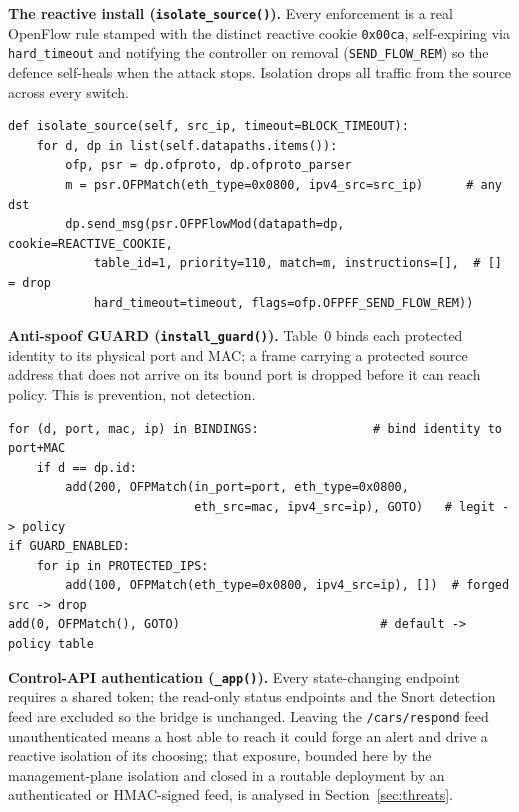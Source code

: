 \noindent \textbf{The reactive install (\texttt{isolate\_source()}).} Every enforcement is a real OpenFlow rule stamped with the distinct reactive cookie \texttt{0x00ca}, self-expiring via \texttt{hard\_timeout} and notifying the controller on removal (\texttt{SEND\_FLOW\_REM}) so the defence self-heals when the attack stops. Isolation drops all traffic from the source across every switch.

\begin{lstlisting}[style=carssrc,caption={Source quarantine: a self-healing drop on every switch (\texttt{REACTIVE\_COOKIE = 0x00CA}).},label={lst:isolate}]
def isolate_source(self, src_ip, timeout=BLOCK_TIMEOUT):
    for d, dp in list(self.datapaths.items()):
        ofp, psr = dp.ofproto, dp.ofproto_parser
        m = psr.OFPMatch(eth_type=0x0800, ipv4_src=src_ip)      # any dst
        dp.send_msg(psr.OFPFlowMod(datapath=dp, cookie=REACTIVE_COOKIE,
            table_id=1, priority=110, match=m, instructions=[],  # [] = drop
            hard_timeout=timeout, flags=ofp.OFPFF_SEND_FLOW_REM))
\end{lstlisting}

\noindent \textbf{Anti-spoof GUARD (\texttt{install\_guard()}).} Table~0 binds each protected identity to its physical port and MAC; a frame carrying a protected source address that does not arrive on its bound port is dropped before it can reach policy. This is prevention, not detection.

\begin{lstlisting}[style=carssrc,caption={Table 0 identity binding and anti-spoof drop.},label={lst:guard}]
for (d, port, mac, ip) in BINDINGS:                # bind identity to port+MAC
    if d == dp.id:
        add(200, OFPMatch(in_port=port, eth_type=0x0800,
                          eth_src=mac, ipv4_src=ip), GOTO)   # legit -> policy
if GUARD_ENABLED:
    for ip in PROTECTED_IPS:
        add(100, OFPMatch(eth_type=0x0800, ipv4_src=ip), [])  # forged src -> drop
add(0, OFPMatch(), GOTO)                            # default -> policy table
\end{lstlisting}

\noindent \textbf{Control-API authentication (\texttt{\_app()}).} Every state-changing endpoint requires a shared token; the read-only status endpoints and the Snort detection feed are excluded so the bridge is unchanged. Leaving the \texttt{/cars/respond} feed unauthenticated means a host able to reach it could forge an alert and drive a reactive isolation of its choosing; that exposure, bounded here by the management-plane isolation and closed in a routable deployment by an authenticated or HMAC-signed feed, is analysed in Section~\ref{sec:threats}.

